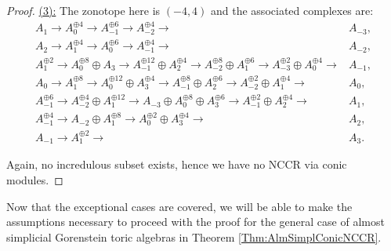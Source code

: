 \documentclass[reqno, 12pt]{amsart}
\theoremstyle{definition}
\numberwithin{equation}{section}
\begin{document}
\begin{proof}
    \underline{(3):} The zonotope here is $(-4,4)$ and the associated complexes are:
    \begin{align*}
        A_1\longrightarrow A_0^{\oplus 4}\longrightarrow A_{-1}^{\oplus 6}\longrightarrow A_{-2}^{\oplus 4}\longrightarrow &A_{-3},\\
        A_2\longrightarrow A_1^{\oplus 4}\longrightarrow A_0^{\oplus 6}\longrightarrow A_{-1}^{\oplus 4}\longrightarrow& A_{-2},\\
        A_1^{\oplus 2}\longrightarrow A_0^{\oplus 8}\oplus A_3\longrightarrow A_{-1}^{\oplus 12}\oplus A_2^{\oplus 4}\longrightarrow A_{-2}^{\oplus 8}\oplus A_1^{\oplus 6}\longrightarrow A_{-3}^{\oplus 2}\oplus A_0^{\oplus 4}\longrightarrow & A_{-1},\\
        A_0\longrightarrow A_1^{\oplus 8}\longrightarrow A_0^{\oplus 12}\oplus A_3^{\oplus 4}\longrightarrow A_{-1}^{\oplus 8}\oplus A_2^{\oplus 6} \longrightarrow A_{-2}^{\oplus 2}\oplus A_1^{\oplus 4}\longrightarrow & A_0,\\
        A_{-1}^{\oplus 6}\longrightarrow A_{-2}^{\oplus 4}\oplus A_1^{\oplus 12}\longrightarrow A_{-3}\oplus A_0^{\oplus 8}\oplus A_3^{\oplus 6}\longrightarrow A_{-1}^{\oplus 2}\oplus A_2^{\oplus 4}\longrightarrow & A_1,\\
        A_{-1}^{\oplus 4}\longrightarrow A_{-2} \oplus A_1^{\oplus 8}\longrightarrow A_0^{\oplus 2}\oplus A_3^{\oplus 4}\longrightarrow & A_2,\\
        A_{-1}\longrightarrow A_1^{\oplus 2}\longrightarrow&  A_3.
    \end{align*}

    Again, no incredulous subset exists, hence we have no NCCR via conic modules.
\end{proof}

Now that the exceptional cases are covered, we will be able to make the assumptions necessary to proceed with the proof for the general case of almost simplicial Gorenstein toric algebras in Theorem \ref{Thm:AlmSimplConicNCCR}.
\end{document}
